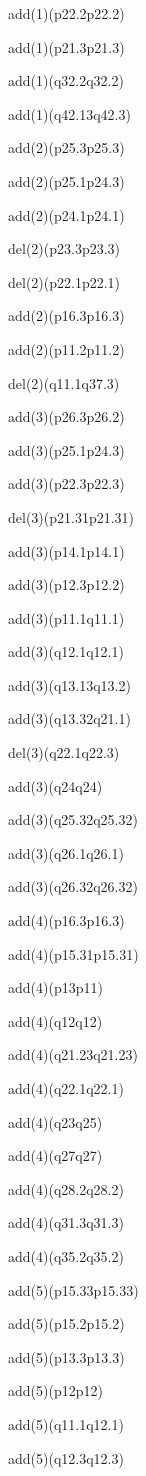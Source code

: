 \documentclass[]{article}
\begin{document}
add(1)(p22.2p22.2)

add(1)(p21.3p21.3)

add(1)(q32.2q32.2)

add(1)(q42.13q42.3)

add(2)(p25.3p25.3)

add(2)(p25.1p24.3)

add(2)(p24.1p24.1)

del(2)(p23.3p23.3)

del(2)(p22.1p22.1)

add(2)(p16.3p16.3)

add(2)(p11.2p11.2)

del(2)(q11.1q37.3)

add(3)(p26.3p26.2)

add(3)(p25.1p24.3)

add(3)(p22.3p22.3)

del(3)(p21.31p21.31)

add(3)(p14.1p14.1)

add(3)(p12.3p12.2)

add(3)(p11.1q11.1)

add(3)(q12.1q12.1)

add(3)(q13.13q13.2)

add(3)(q13.32q21.1)

del(3)(q22.1q22.3)

add(3)(q24q24)

add(3)(q25.32q25.32)

add(3)(q26.1q26.1)

add(3)(q26.32q26.32)

add(4)(p16.3p16.3)

add(4)(p15.31p15.31)

add(4)(p13p11)

add(4)(q12q12)

add(4)(q21.23q21.23)

add(4)(q22.1q22.1)

add(4)(q23q25)

add(4)(q27q27)

add(4)(q28.2q28.2)

add(4)(q31.3q31.3)

add(4)(q35.2q35.2)

add(5)(p15.33p15.33)

add(5)(p15.2p15.2)

add(5)(p13.3p13.3)

add(5)(p12p12)

add(5)(q11.1q12.1)

add(5)(q12.3q12.3)
\end{document}
